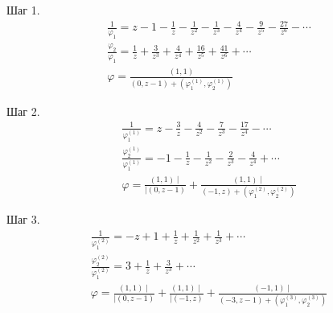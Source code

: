 Шаг 1.\\
\begin{eqnarray}
\frac {1}{\varphi_1}=z-1-\frac{1}{z}-\frac{1}{z^2}-\frac{1}{z^3}-\frac{4}{z^4}-\frac{9}{z^5}-\frac{27}{z^6}-\cdots\nonumber\\
\frac {\varphi_2}{\varphi_1}=\frac{1}{z}+\frac{3}{z^3}+\frac{4}{z^4}+\frac{16}{z^5}+\frac{41}{z^6}+\cdots\nonumber\\
\varphi {= \frac{(1,1)}{(0,z-1) +
(\varphi_{1}^{(1)},\varphi_{2}^{(1)}) } }\nonumber
\end{eqnarray}

Шаг 2.\\
\begin{eqnarray}
\frac {1}{\varphi_1^{(1)}}=z-\frac{3}{z}-\frac{4}{z^2}-\frac{7}{z^3}-\frac{17}{z^4}-\cdots\nonumber\\
\frac {\varphi_2^{(1)}}{\varphi_1^{(1)}}=-1-\frac{1}{z}-\frac{1}{z^2}-\frac{2}{z^3}-\frac{4}{z^4}+\cdots\nonumber\\
\varphi = \frac{(1,1)\mid} {\mid(0,z-1)} +\frac{(1,1)\mid}
{(-1,z)+(\varphi_{1}^{(2)},\varphi_{2}^{(2)})} \nonumber
\end{eqnarray}

Шаг 3.\\
\begin{eqnarray}
\frac {1}{\varphi_1^{(2)}}=-z+1+\frac{1}{z}+\frac{1}{z^2}+\frac{1}{z^3}+\cdots\nonumber\\
\frac {\varphi_2^{(2)}}{\varphi_1^{(2)}}=3+\frac{1}{z}+\frac{3}{z^3}+\cdots\nonumber\\
\varphi = \frac{(1,1)\mid} {\mid(0,z-1)}+ \frac{(1,1)\mid}
{\mid(-1,z)}+ \frac{(-1,1)\mid}
{(-3,z-1)+(\varphi_{1}^{(3)},\varphi_{2}^{(3)})} \nonumber
\end{eqnarray}

